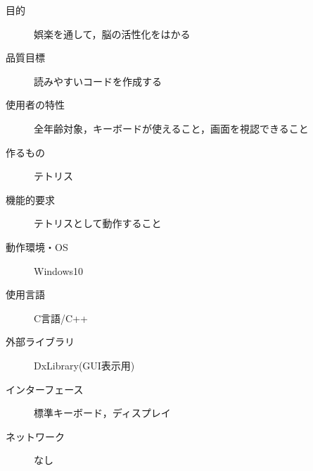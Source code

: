 \begin{description}
  \item[目的] 娯楽を通して，脳の活性化をはかる
  \item[品質目標] 読みやすいコードを作成する
  \item[使用者の特性] 全年齢対象，キーボードが使えること，画面を視認できること
  \item[作るもの] テトリス
  \item[機能的要求] テトリスとして動作すること
  \item[動作環境・OS] Windows10
  \item[使用言語] C言語/C++
  \item[外部ライブラリ] DxLibrary(GUI表示用)
  \item[インターフェース] 標準キーボード，ディスプレイ
  \item[ネットワーク] なし
\end{description}
